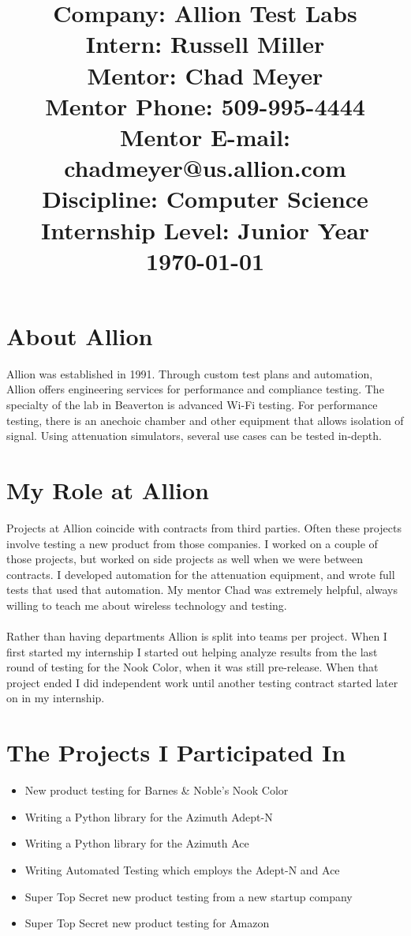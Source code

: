 \documentclass{article}
\title{Company: Allion Test Labs\\
Intern: Russell Miller\\
Mentor: Chad Meyer\\
Mentor Phone: 509-995-4444\\
Mentor E-mail: chadmeyer@us.allion.com\\
Discipline: Computer Science\\
Internship Level: Junior Year\\
\today}
\date{}
\begin{document}
\maketitle

\pagebreak

\section*{About Allion}
Allion was established in 1991. Through custom test plans and automation, Allion
offers engineering services for performance and compliance testing. 
The specialty of the lab in Beaverton is advanced Wi-Fi testing. For performance
testing, there is an anechoic chamber and other equipment that allows isolation
of signal. Using attenuation simulators, several use cases can be tested 
in-depth.

\section*{My Role at Allion}
Projects at Allion coincide with contracts from third parties. Often these
projects involve testing a new product from those companies. I worked on a
couple of those projects, but worked on side projects as well when we were
between contracts. I developed automation for the attenuation equipment, and
wrote full tests that used that automation. My mentor Chad was extremely 
helpful, always willing to teach me about wireless technology and testing.\\
\\
Rather than having departments Allion is split into teams per project. When I
first started my internship I started out helping analyze results from the last 
round of testing for the Nook Color, when it was still pre-release. When that
project ended I did independent work until another testing contract started
later on in my internship.

\section*{The Projects I Participated In}
\begin{itemize}
\item New product testing for Barnes \& Noble's Nook Color
\item Writing a Python library for the Azimuth Adept-N
\item Writing a Python library for the Azimuth Ace
\item Writing Automated Testing which employs the Adept-N and Ace
\item Super Top Secret new product testing from a new startup company
\item Super Top Secret new product testing for Amazon
\end{itemize}
\end{document}
